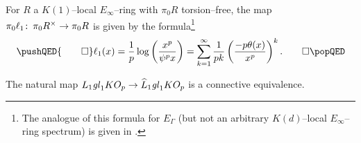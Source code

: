 \begin{theorem}\label{RezkLogFormula}
For \(R\) a \(K(1)\)--local \(E_\infty\)--ring with \(\pi_0 R\) torsion--free, the map \(\pi_0 \ell_1\colon\thinspace \pi_0 R^\times \to \pi_0 R\) is given by the formula\footnote{The analogue of this formula for \(E_\Gamma\) (but not an arbitrary \(K(d)\)--local \(E_\infty\)--ring spectrum) is given in \cite[Subsection 1.10]{RezkLogarithm}.} \[\pushQED{\qed} \ell_1(x) = \frac{1}{p} \log\left(\frac{x^p}{\psi^p x}\right) = \sum_{k=1}^\infty \frac{1}{p k} \left(\frac{- p \theta(x)}{x^p}\right)^k. \qedhere \popQED\]
\end{theorem}

\begin{corollary}
The natural map \(L_1 \mathit{gl}_1 KO_p \to \widehat L_1 \mathit{gl}_1 KO_p\) is a connective equivalence.
\end{corollary}

